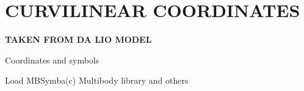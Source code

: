 \documentclass{article}
\begin{document}
\section{\textbf{CURVILINEAR COORDINATES}}
\begin{maplegroup}
\begin{Maple Normal}{
\textbf{TAKEN FROM DA LIO MODEL}}\end{Maple Normal}

\end{maplegroup}
\begin{maplegroup}
\begin{Maple Normal}{
Coordinates and symbols}\end{Maple Normal}

\end{maplegroup}
\begin{maplegroup}
\begin{Maple Normal}{
}\end{Maple Normal}
\end{maplegroup}
\begin{maplegroup}
\begin{Maple Normal}{
Load MBSymba(c) Multibody library and others}\end{Maple Normal}

\end{maplegroup}
\begin{maplegroup}
\begin{mapleinput}
\end{mapleinput}
\begin{mapleinput}
\end{mapleinput}
\end{maplegroup}
\end{document}
